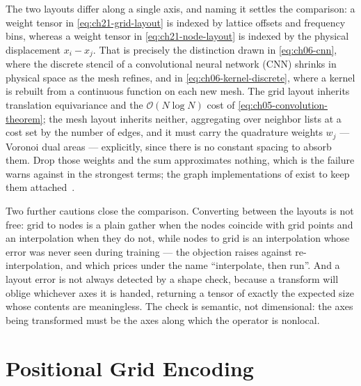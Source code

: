 The two layouts differ along a single axis, and naming it settles the comparison: a
weight tensor in \eqref{eq:ch21-grid-layout} is indexed by lattice offsets and frequency
bins, whereas a weight tensor in \eqref{eq:ch21-node-layout} is indexed by the physical
displacement $x_i - x_j$. That is precisely the distinction drawn in
\eqref{eq:ch06-cnn}, where the discrete stencil of a convolutional neural network (CNN)
shrinks in physical space as the mesh refines, and in \eqref{eq:ch06-kernel-discrete},
where a kernel is rebuilt from a continuous function on each new mesh. The grid layout
inherits translation equivariance and the $\mathcal{O}(N \log N)$ cost of
\eqref{eq:ch05-convolution-theorem}; the mesh layout inherits neither, aggregating over
neighbor lists at a cost set by the number of edges, and it must carry the quadrature
weights $w_j$ --- Voronoi dual areas --- explicitly, since there is no constant spacing to
absorb them. Drop those weights and the sum approximates nothing, which is the
failure  warns against in
the strongest terms; the graph implementations of
 exist to keep
them attached~\cite{li2023geometry}.

Two further cautions close the comparison. Converting between the layouts is not free:
grid to nodes is a plain gather when the nodes coincide with grid points and an
interpolation when they do not, while nodes to grid is an interpolation whose error was
never seen during training --- the objection
 raises against
re-interpolation, and which
 prices under the name
``interpolate, then run''. And a layout error is not
always detected by a shape check, because a transform will oblige whichever axes it is
handed, returning a tensor of exactly the expected size whose contents are meaningless.
The check is semantic, not dimensional: the axes being transformed must be the axes along
which the operator is nonlocal.

\section{Positional Grid Encoding}
\label{sec:ch21-grid-embedding}

